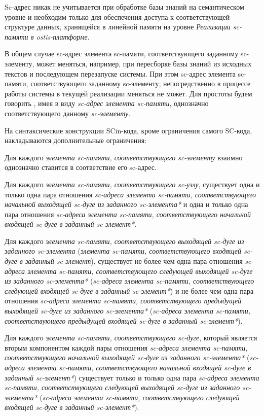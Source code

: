 Sc-адрес никак не учитывается при обработке базы знаний на семантическом уровне и необходим только для обеспечения доступа к соответствующей структуре данных, хранящейся в линейной памяти на уровне \textit{Реализации sc-памяти в ostis-платформе}.

В общем случае sc-адрес элемента sc-памяти, соответствующего заданному sc-элементу, может меняться, например, при пересборке базы знаний из исходных текстов и последующем перезапуске системы. При этом sc-адрес элемента sc-памяти, соответствующего заданному sc-элементу, непосредственно в процессе работы системы в текущей реализации меняться не может. Для простоты будем говорить , имея в виду \textit{sc-адрес} \textit{элемента sc-памяти}, однозначно соответствующего данному \textit{sc-элементу}.

На синтаксические конструкции SCin-кода, кроме ограничения самого SC-кода, накладываются дополнительные ограничения:
\begin{textitemize}
    \item Для каждого \textit{элемента sc-памяти, соответствующего sc-элементу} взаимно однозначно ставится в соответствие его sc-адрес.
    \item Для каждого \textit{элемента sc-памяти, соответствующего sc-узлу}, существует одна и только одна пара отношения \textit{sc-адреса элемента sc-памяти, соответствующего начальной выходящей sc-дуге из заданного sc-элемента*} и одна и только одна пара отношения \textit{sc-адреса элемента sc-памяти, соответствующего начальной входящей sc-дуге в заданный sc-элемент*}.
    \item Для каждого \textit{элемента sc-памяти, соответствующего выходящей sc-дуге из заданного sc-элемента} (\textit{элемента sc-памяти, соответствующего входящей sc-дуге в заданный sc-элемент}), существует не более чем одна пара отношения \textit{sc-адреса элемента sc-памяти, соответствующего следующей выходящей sc-дуге из заданного sc-элемента*} (\textit{sc-адреса элемента sc-памяти, соответствующего следующей входящей sc-дуге в заданный sc-элемент*}) и не более чем одна пара отношения \textit{sc-адреса элемента sc-памяти, соответствующего предыдущей выходящей sc-дуге из заданного sc-элемента*} (\textit{sc-адреса элемента sc-памяти, соответствующего предыдущей входящей sc-дуге в заданный sc-элемент*}).
    \item Для каждого \textit{элемента sc-памяти, соответствующего sc-дуге}, который является вторым компонентом каждой пары отношения \textit{sc-адреса элемента sc-памяти, соответствующего начальной выходящей sc-дуге из заданного sc-элемента*} (\textit{sc-адреса элемента sc-памяти, соответствующего начальной входящей sc-дуге в заданный sc-элемент*}) существует только и только одна пара \textit{sc-адреса элемента sc-памяти, соответствующего следующей выходящей sc-дуге из заданного sc-элемента*} (\textit{sc-адреса элемента sc-памяти, соответствующего следующей входящей sc-дуге в заданный sc-элемент*}).
\end{textitemize}

